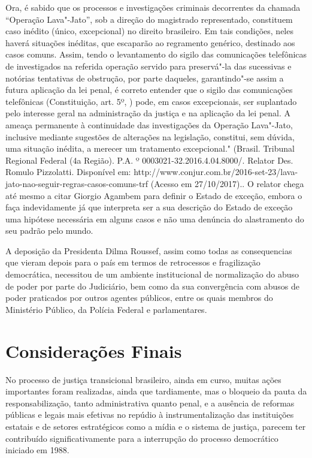 {  Ora, é sabido que os processos e investigações criminais decorrentes
  da chamada ``Operação Lava"-Jato'', sob a direção do magistrado
  representado, constituem caso inédito (único, excepcional) no direito
  brasileiro. Em tais condições, neles haverá situações inéditas, que
  escaparão ao regramento genérico, destinado aos casos comuns. Assim,
  tendo o levantamento do sigilo das comunicações telefônicas de
  investigados na referida operação servido para preservá"-la das
  sucessivas e notórias tentativas de obstrução, por parte daqueles,
  garantindo"-se assim a futura aplicação da lei penal, é correto
  entender que o sigilo das comunicações telefônicas (Constituição, art.
  5º, ) pode, em casos excepcionais, ser suplantado pelo interesse
  geral na administração da justiça e na aplicação da lei penal. A
  ameaça permanente à continuidade das investigações da Operação
  Lava"-Jato, inclusive mediante sugestões de alterações na legislação,
  constitui, sem dúvida, uma situação inédita, a merecer um tratamento
  excepcional." (Brasil. Tribunal Regional Federal (4a Região). P.A.
    º 0003021-32.2016.4.04.8000/. Relator Des. Romulo
  Pizzolatti. Disponível em:
  http://www.conjur.com.br/2016-set-23/lava-jato-nao-seguir-regras-casos-comuns-trf
  (Acesso em 27/10/2017).}. O relator chega até mesmo a citar Giorgio
Agambem para definir o Estado de exceção, embora o faça indevidamente já
que interpreta ser a sua descrição do Estado de exceção uma hipótese
necessária em alguns casos e não uma denúncia do alastramento do seu
padrão pelo mundo.

A deposição da Presidenta Dilma Roussef, assim como todas as
consequencias que vieram depois para o país em termos de retrocessos e
fragilização democrática, necessitou de um ambiente institucional de
normalização do abuso de poder por parte do Judiciário, bem como da sua
convergência com abusos de poder praticados por outros agentes públicos,
entre os quais membros do Ministério Público, da Polícia Federal e
parlamentares.

\section{Considerações Finais}

No processo de justiça transicional brasileiro, ainda em curso, muitas
ações importantes foram realizadas, ainda que tardiamente, mas o
bloqueio da pauta da responsabilização, tanto administrativa quanto
penal, e a ausência de reformas públicas e legais mais efetivas no
repúdio à instrumentalização das instituições estatais e de setores
estratégicos como a mídia e o sistema de justiça, parecem ter
contribuído significativamente para a interrupção do processo
democrático iniciado em 1988.

